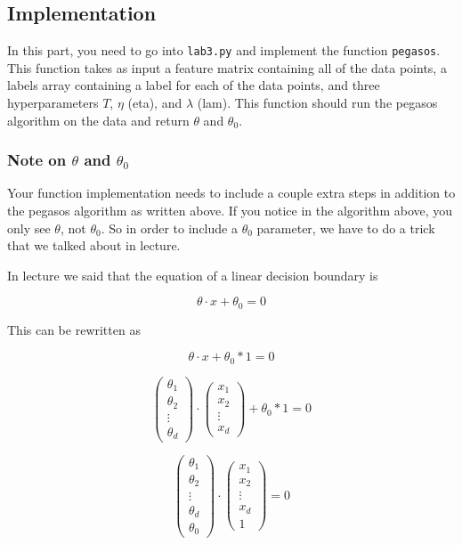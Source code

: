 \documentclass{article}
\begin{document}
\subsection{Implementation}

In this part, you need to go into \texttt{lab3.py} and implement the function \texttt{pegasos}. This function takes as input a feature matrix containing all of the data points, a labels array containing a label for each of the data points, and three hyperparameters $T$, $\eta$ (eta), and $\lambda$ (lam). This function should run the pegasos algorithm on the data and return $\theta$ and $\theta_0$.

\subsubsection{Note on $\theta$ and $\theta_0$}

Your function implementation needs to include a couple extra steps in addition to the pegasos algorithm as written above. If you notice in the algorithm above, you only see $\theta$, not $\theta_0$. So in order to include a $\theta_0$ parameter, we have to do a trick that we talked about in lecture.

In lecture we said that the equation of a linear decision boundary is

$$\theta \cdot x + \theta_0 = 0$$

This can be rewritten as

$$\theta \cdot x + \theta_0 * 1 = 0$$

$$
\begin{pmatrix}
    \theta_1 \\
    \theta_2 \\
    \vdots \\
    \theta_d
\end{pmatrix}
\cdot
\begin{pmatrix}
    x_1 \\
    x_2 \\
    \vdots \\
    x_d
\end{pmatrix}
+
\theta_0 * 1
= 0
$$

$$
\begin{pmatrix}
    \theta_1 \\
    \theta_2 \\
    \vdots \\
    \theta_d \\
    \theta_0
\end{pmatrix}
\cdot
\begin{pmatrix}
    x_1 \\
    x_2 \\
    \vdots \\
    x_d \\
    1
\end{pmatrix}
= 0
$$
\end{document}
